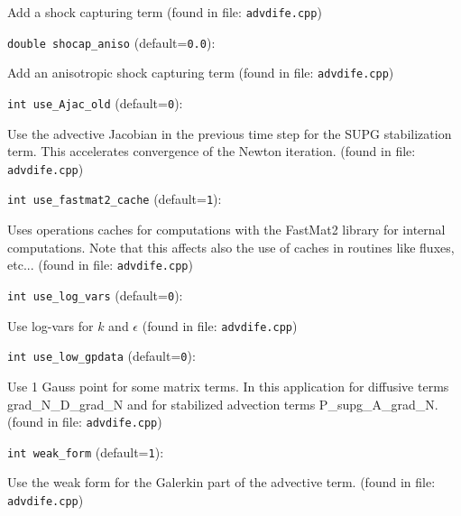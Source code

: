Add a shock capturing term
 (found in file: \verb+advdife.cpp+)
\item\verb+double shocap_aniso+ {\rm(default=\verb|0.0|)}:

Add an anisotropic shock capturing term
 (found in file: \verb+advdife.cpp+)
\item\verb+int use_Ajac_old+ {\rm(default=\verb|0|)}:

Use the advective Jacobian in the previous time step
 for the SUPG stabilization term. This accelerates
 convergence of the Newton iteration.
 (found in file: \verb+advdife.cpp+)
\item\verb+int use_fastmat2_cache+ {\rm(default=\verb|1|)}:

Uses operations caches for computations with the FastMat2
 library for internal computations. Note that this affects also the
 use of caches in routines like fluxes, etc...
 (found in file: \verb+advdife.cpp+)
\item\verb+int use_log_vars+ {\rm(default=\verb|0|)}:

Use log-vars for $k$ and $\epsilon$
 (found in file: \verb+advdife.cpp+)
\item\verb+int use_low_gpdata+ {\rm(default=\verb|0|)}:

Use 1 Gauss point for some matrix terms.
In this application for diffusive terms grad_N_D_grad_N
and for stabilized advection terms P_supg_A_grad_N.
 (found in file: \verb+advdife.cpp+)
\item\verb+int weak_form+ {\rm(default=\verb|1|)}:

Use the weak form for the Galerkin part of the advective term.
 (found in file: \verb+advdife.cpp+)
